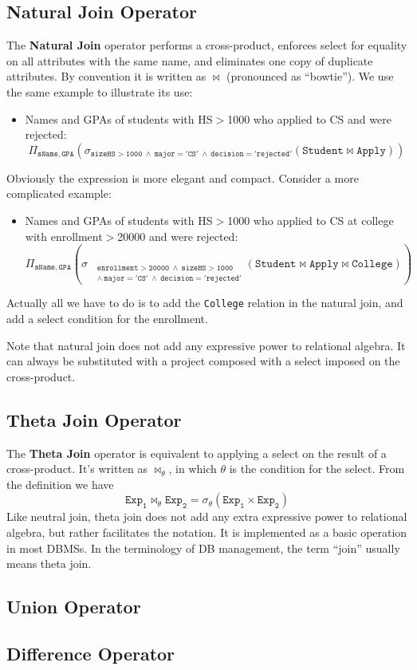 \subsection{Natural Join Operator}
The \textbf{Natural Join} operator performs a cross-product, enforces select for equality on all attributes with the same name, and eliminates one copy of duplicate attributes. By convention it is written as $\bowtie$ (pronounced as ``bowtie''). We use the same example to illustrate its use:
\begin{itemize}
\item Names and GPAs of students with HS$>$1000 who applied to CS and were rejected:
\begin{equation*}
\mathtt{\Pi_{sName,GPA}\left(\sigma_{sizeHS>1000\:\land\:major='CS'\:\land\:decision='rejected'}\left(Student\bowtie Apply\right)\right)}
\end{equation*}
\end{itemize}
Obviously the expression is more elegant and compact. Consider a more complicated example:
\begin{itemize}
\item Names and GPAs of students with HS$>$1000 who applied to CS at college with enrollment$>$20000 and were rejected:
\begin{equation*}
\mathtt{\Pi_{sName,GPA}\left(\sigma_{
\begin{aligned}
&\mathtt{\scriptstyle enrollment>20000\:\land\:sizeHS>1000}\\
&\mathtt{\scriptstyle\land\:major='CS'\:\land\:decision='rejected'}
\end{aligned}
}\left(Student\bowtie Apply\bowtie College\right)\right)}
\end{equation*}
\end{itemize}
Actually all we have to do is to add the \texttt{College} relation in the natural join, and add a select condition for the enrollment.

Note that natural join does not add any expressive power to relational algebra. It can always be substituted with a project composed with a select imposed on the cross-product.
\subsection{Theta Join Operator}
The \textbf{Theta Join} operator is equivalent to applying a select on the result of a cross-product. It's written as $\bowtie_{\theta}$, in which $\theta$ is the condition for the select. From the definition we have 
\begin{equation*}
\mathtt{Exp_1\bowtie_{\theta}Exp_2 = \sigma_{\theta}(Exp_1\times Exp_2)}
\end{equation*}
Like neutral join, theta join does not add any extra expressive power to relational algebra, but rather facilitates the notation. It is implemented as a basic operation in most DBMSs. In the terminology of DB management, the term ``join'' usually means theta join. 
\subsection{Union Operator}
\subsection{Difference Operator}
\ifx\PREAMBLE\undefined

\fi
